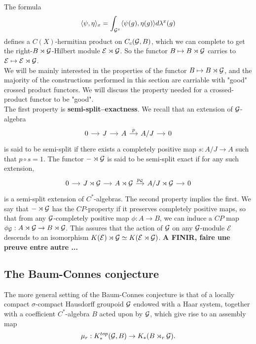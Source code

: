 The formula 
\[\langle \psi, \eta\rangle_x = \int_{\mathcal G^x} \langle \psi(g),\eta(g)\rangle d\lambda^x(g)\] 
defines a $C(X)$-hermitian product on $C_c(\mathcal G,B)$, which we can complete to get the right-$B\rtimes \mathcal G$-Hilbert module $\mathcal E\rtimes \mathcal G$. So the functor $B\mapsto B\rtimes \mathcal G $ carries to $\mathcal E\mapsto \mathcal E\rtimes \mathcal G$. \\

We will be mainly interested in the properties of the functor $B\mapsto B\rtimes \mathcal G$, and the majority of the constructions performed in this section are carriable with "good" crossed product functors. We will discuss the property needed for a crossed-product functor to be "good".\\  
The first property is \textbf{semi-split--exactness}. We recall that an extension of $\mathcal G$-algebra \[\begin{tikzcd}[column sep = small]0\arrow{r} & J \arrow{r} & A\arrow{r}{p} & A/J \arrow{r} & 0\end{tikzcd}\] is said to be semi-split if there exists a completely positive map $s : A/J \rightarrow A$ such that $p\circ s = 1$. The functor $-\rtimes \mathcal G$ is said to be semi-split exact if for any such extension, \[\begin{tikzcd}[column sep = small]0\arrow{r} & J\rtimes \G \arrow{r} & A\rtimes \G\arrow{r}{p_\G} & A/J\rtimes \G \arrow{r} & 0\end{tikzcd}\] is a semi-split extension of $C^*$-algebras.
The second property implies the first. We say that $-\rtimes \mathcal G$ has the $CP$-property if it preserves completely positive maps, so that from any $\mathcal G$-completely positive map $\phi: A\rightarrow B$, we can induce a $CP$ map $\phi_\mathcal G: A\rtimes\mathcal G\rightarrow B\rtimes \mathcal G$. This assures that the action of $\mathcal G$ on any $\mathcal G$-module $\mathcal E$ descends to an isomorphism $K(\mathcal E)\rtimes \mathcal G \simeq K(\mathcal E\rtimes \mathcal G)$.
 \textbf{A FINIR, faire une preuve entre autre ...}
  
\subsection{The Baum-Connes conjecture}
The more general setting of the Baum-Connes conjecture \cite{TuBC} is that of a locally compact $\sigma$-compact Hausdorff groupoid $\mathcal G$ endowed with a Haar system, together with a coefficient $C^*$-algebra $B$ acted upon by $\mathcal G$, which give rise to an assembly map
\[\mu_r : K^{top}_*(\mathcal G,B)\rightarrow K_*(B\rtimes_r \mathcal G).\]

